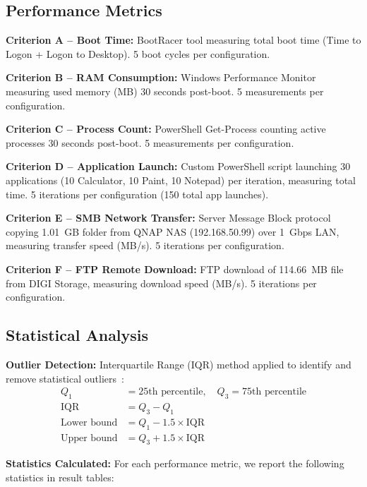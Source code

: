 \documentclass[runningheads,a4paper,english]{llncs}[2022/01/12]
\begin{document}
\subsection{Performance Metrics}

\textbf{Criterion A -- Boot Time:} BootRacer tool measuring total boot time (Time to Logon + Logon to Desktop). 5 boot cycles per configuration.

\textbf{Criterion B -- RAM Consumption:} Windows Performance Monitor measuring used memory (MB) 30 seconds post-boot. 5 measurements per configuration.

\textbf{Criterion C -- Process Count:} PowerShell Get-Process counting active processes 30 seconds post-boot. 5 measurements per configuration.

\textbf{Criterion D -- Application Launch:} Custom PowerShell script launching 30 applications (10 Calculator, 10 Paint, 10 Notepad) per iteration, measuring total time. 5 iterations per configuration (150 total app launches).

\textbf{Criterion E -- SMB Network Transfer:} Server Message Block protocol copying 1.01~GB folder from QNAP NAS (192.168.50.99) over 1~Gbps LAN, measuring transfer speed (MB/s). 5 iterations per configuration.

\textbf{Criterion F -- FTP Remote Download:} FTP download of 114.66~MB file from DIGI Storage, measuring download speed (MB/s). 5 iterations per configuration.

\subsection{Statistical Analysis}

\textbf{Outlier Detection:} Interquartile Range (IQR) method applied to identify and remove statistical outliers~\cite{tukey1977}:
\begin{align*}
Q_1 &= \text{25th percentile}, \quad Q_3 = \text{75th percentile} \\
\text{IQR} &= Q_3 - Q_1 \\
\text{Lower bound} &= Q_1 - 1.5 \times \text{IQR} \\
\text{Upper bound} &= Q_3 + 1.5 \times \text{IQR}
\end{align*}

\textbf{Statistics Calculated:} For each performance metric, we report the following statistics in result tables:
\end{document}
